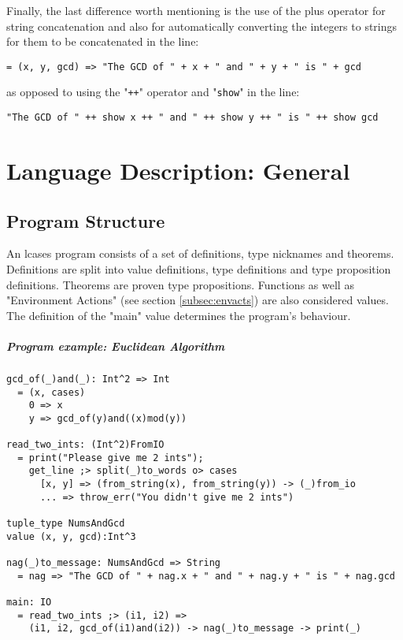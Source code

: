 \documentclass[diploma]{softlab-thesis}
\begin{document}
Finally, the last difference worth mentioning is the use of the plus operator
for string concatenation and also for automatically converting the integers to
strings for them to be concatenated in the line:
\begin{verbatim}
= (x, y, gcd) => "The GCD of " + x + " and " + y + " is " + gcd
\end{verbatim}
as opposed to using the "\verb|++|" operator and "\verb|show|" in the line:
\begin{verbatim}
"The GCD of " ++ show x ++ " and " ++ show y ++ " is " ++ show gcd
\end{verbatim}

\chapter{Language Description: General}

\section{Program Structure}

An lcases program consists of a set of definitions, type nicknames and
theorems.  Definitions are split into value definitions, type definitions and
type proposition definitions. Theorems are proven type propositions. Functions
as well as "Environment Actions" (see section \ref{subsec:envacts}) are also
considered values. The definition of the "main" value determines the program's
behaviour.

\paragraph{Program example: Euclidean Algorithm}
\begin{verbatim}
gcd_of(_)and(_): Int^2 => Int
  = (x, cases)
    0 => x
    y => gcd_of(y)and((x)mod(y))

read_two_ints: (Int^2)FromIO
  = print("Please give me 2 ints");
    get_line ;> split(_)to_words o> cases
      [x, y] => (from_string(x), from_string(y)) -> (_)from_io
      ... => throw_err("You didn't give me 2 ints")

tuple_type NumsAndGcd
value (x, y, gcd):Int^3

nag(_)to_message: NumsAndGcd => String
  = nag => "The GCD of " + nag.x + " and " + nag.y + " is " + nag.gcd

main: IO
  = read_two_ints ;> (i1, i2) =>
    (i1, i2, gcd_of(i1)and(i2)) -> nag(_)to_message -> print(_)
\end{verbatim}
\end{document}
